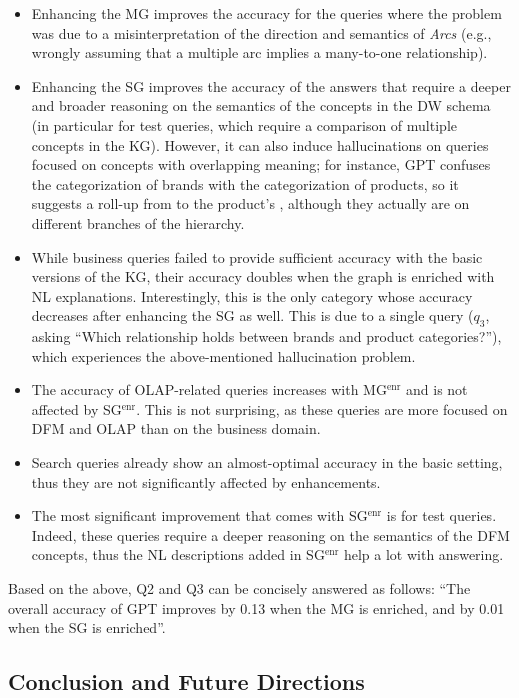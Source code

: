 \begin{itemize}
    \item Enhancing the MG improves the accuracy for the queries where the problem was due to a misinterpretation of the direction and semantics of \textit{Arcs} (e.g., wrongly assuming that a multiple arc implies a many-to-one relationship).
    \item Enhancing the SG improves the accuracy of the answers that require a deeper and broader reasoning on the semantics of the concepts in the DW schema (in particular for test queries, which require a comparison of multiple concepts in the KG). However, it can also induce hallucinations on queries focused on concepts with overlapping meaning; for instance, GPT confuses the categorization of brands with the categorization of products, so it suggests a roll-up from  to the product's , although they actually are on different branches of the  hierarchy.
    \item While business queries failed to provide sufficient accuracy with the basic versions of the KG, their accuracy doubles when the graph is enriched with NL explanations. Interestingly, this is the only category whose accuracy decreases after enhancing the SG as well. This is due to a single query ($q_3$, asking ``Which relationship holds between brands and product categories?''), which experiences the above-mentioned hallucination problem.
    \item The accuracy of OLAP-related queries increases with MG$^\text{enr}$ and is not affected by SG$^\text{enr}$. This is not surprising, as these queries are more focused on DFM and OLAP than on the business domain.
    \item Search queries already show an almost-optimal accuracy in the basic setting, thus they are not significantly affected by enhancements.
    \item The most significant improvement that comes with SG$^\text{enr}$ is for test queries. Indeed, these queries require a deeper reasoning on the semantics of the DFM concepts, thus the NL descriptions added in SG$^\text{enr}$ help a lot with answering.
\end{itemize}

Based on the above, Q2 and Q3 can be concisely answered as follows: ``The overall accuracy of GPT improves by 0.13 when the MG is enriched, and by 0.01 when the SG is enriched''.

\subsection{Conclusion and Future Directions}
\label{sec:llm-concl}


